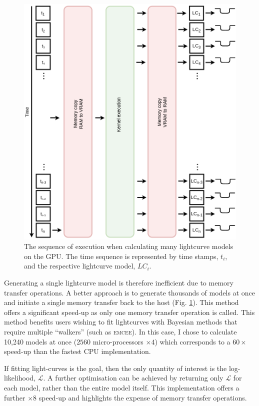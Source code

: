 \begin{figure}
    \centering
    \includegraphics[width = \textwidth]{9-Discussion/images/GPU_execution_2.png}
    \caption{The sequence of execution when calculating many lightcurve models on the GPU. The time sequence is represented by time stamps, $t_i$, and the respective lightcurve model, $LC_i$.  }
    \label{discussion:fig:GPU_execution_2}
\end{figure}

Generating a single lightcurve model is therefore inefficient due to memory transfer operations. A better approach is to generate thousands of models at once and initiate a single memory transfer back to the host (Fig. \ref{discussion:fig:GPU_execution_2}). This method offers a significant speed-up as only one memory transfer operation is called. This method benefits users wishing to fit lightcurves with Bayesian methods that require multiple ``walkers'' (such as \textsc{emcee}). In this case, I chose to calculate 10,240 models at once ($2560$ micro-processors $\times 4$) which corresponds to a $60\times$ speed-up than the fastest CPU implementation.  

If fitting light-curves is the goal, then the only quantity of interest is the log-likelihood, $\mathcal{L}$.  A further optimisation can be achieved by returning only $\mathcal{L}$ for each model, rather than the entire model itself. This implementation offers a further $\times 8$ speed-up and  highlights the expense of memory transfer operations.

